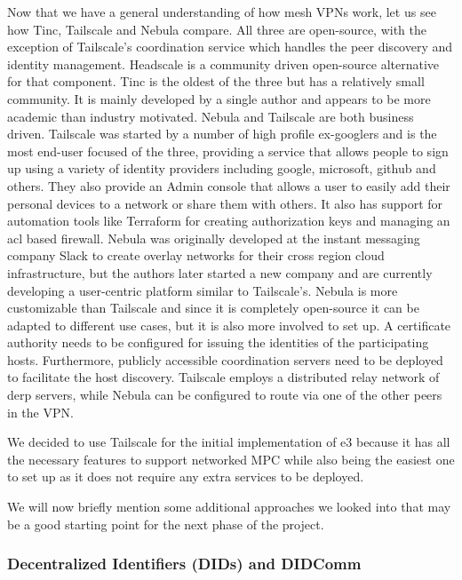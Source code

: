 \documentclass[
]{article}
\begin{document}
Now that we have a general understanding of how mesh VPNs work, let us
see how Tinc, Tailscale and Nebula compare. All three are open-source,
with the exception of Tailscale's coordination service which handles the
peer discovery and identity management. Headscale
\autocite{fontJuanfontHeadscale2022} is a community driven open-source
alternative for that component. Tinc is the oldest of the three but has
a relatively small community. It is mainly developed by a single author
and appears to be more academic than industry motivated. Nebula and
Tailscale are both business driven. Tailscale was started by a number of
high profile ex-googlers and is the most end-user focused of the three,
providing a service that allows people to sign up using a variety of
identity providers including google, microsoft, github and others. They
also provide an Admin console that allows a user to easily add their
personal devices to a network or share them with others. It also has
support for automation tools like Terraform for creating authorization
keys and managing an \gls{acl} based firewall. Nebula was originally
developed at the instant messaging company Slack to create overlay
networks for their cross region cloud infrastructure, but the authors
later started a new company and are currently developing a user-centric
platform similar to Tailscale's. Nebula is more customizable than
Tailscale and since it is completely open-source it can be adapted to
different use cases, but it is also more involved to set up. A
certificate authority needs to be configured for issuing the identities
of the participating hosts. Furthermore, publicly accessible
coordination servers need to be deployed to facilitate the host
discovery. Tailscale employs a distributed relay network of \gls{derp}
servers, while Nebula can be configured to route via one of the other
peers in the VPN.

We decided to use Tailscale for the initial implementation of \gls{e3}
because it has all the necessary features to support networked MPC while
also being the easiest one to set up as it does not require any extra
services to be deployed.

We will now briefly mention some additional approaches we looked into
that may be a good starting point for the next phase of the project.

\hypertarget{decentralized-identifiers-dids-and-didcomm}{%
  \subsubsection{Decentralized Identifiers (DIDs) and
    DIDComm}\label{decentralized-identifiers-dids-and-didcomm}}
\end{document}
